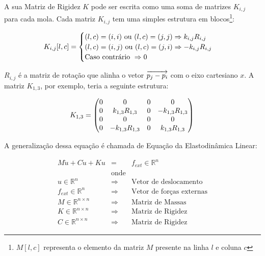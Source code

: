 A sua Matriz de Rigidez $K$ pode ser escrita como uma soma de matrizes $K_{i,j}$ para cada mola. Cada matriz $K_{i,j}$ tem uma simples estrutura em blocos\footnote{$M[l, c]$ representa o elemento da matriz $M$ presente na linha $l$ e coluna $c$}:

\begin{equation}
K_{i,j}[l, c] = \begin{cases}
	(l, c) = (i, i) \text{ ou } (l, c) = (j, j) \Rightarrow k_{i,j}R_{i,j} \\
	(l, c) = (i, j) \text{ ou } (l, c) = (j, i) \Rightarrow -k_{i,j}R_{i,j} \\
	\text{Caso contrário } \Rightarrow 0 \\
	\end{cases}\\
\end{equation}

$R_{i,j}$ é a matriz de rotação que alinha o vetor $\overrightarrow{p_j-p_i}$ com o eixo cartesiano $x$. A matriz $K_{1,3}$, por exemplo, teria a seguinte estrutura:

\begin{equation}
	K_{1,3} = \begin{pmatrix}
		0 & 0 & 0 & 0\\
		0 & k_{1,3}R_{1,3} & 0 & -k_{1,3}R_{1,3}\\
		0 & 0 & 0 & 0\\
		0 & -k_{1,3}R_{1,3} & 0 & k_{1,3}R_{1,3}
	\end{pmatrix}\\
\end{equation}

A generalização dessa equação é chamada de Equação da Elastodinâmica Linear: 

\begin{eqnarray}
M\ddot{u} + C\dot{u} + Ku &=& f_{ext} \in \mathbb{R}^n \label{elastodynamic} \\
&\text{onde}&\nonumber\\
u \in \mathbb{R}^{n} &\Rightarrow& \text{Vetor de deslocamento} \nonumber\\
f_{ext} \in \mathbb{R}^{n} &\Rightarrow& \text{Vetor de forças externas} \nonumber\\
M \in \mathbb{R}^{n\times n} &\Rightarrow& \text{Matriz de Massas} \nonumber\\
K \in \mathbb{R}^{n\times n} &\Rightarrow& \text{Matriz de Rigidez} \nonumber\\
C \in \mathbb{R}^{n\times n} &\Rightarrow& \text{Matriz de Rigidez} \nonumber
\end{eqnarray}

